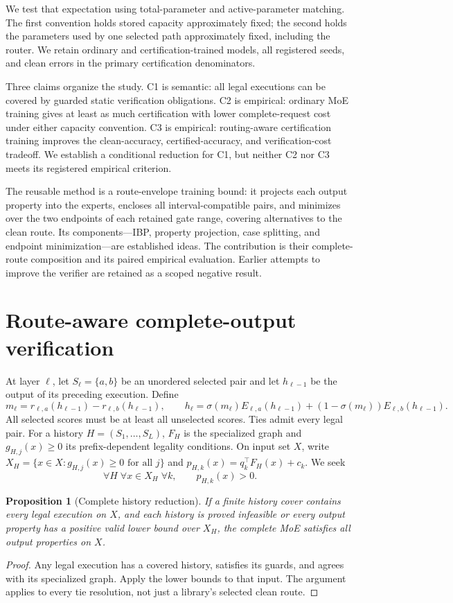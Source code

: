 \documentclass[10pt]{article}
\newtheorem{proposition}{Proposition}
\begin{document}
We test that expectation using total-parameter and active-parameter matching.
The first convention holds stored capacity approximately fixed; the second
holds the parameters used by one selected path approximately fixed, including
the router. We retain ordinary and certification-trained models, all registered
seeds, and clean errors in the primary certification denominators.

Three claims organize the study. C1 is semantic: all legal executions can be
covered by guarded static verification obligations. C2 is empirical: ordinary
MoE training gives at least as much certification with lower complete-request
cost under either capacity convention. C3 is empirical: routing-aware
certification training improves the clean-accuracy, certified-accuracy, and
verification-cost tradeoff. We establish a conditional reduction for C1, but
neither C2 nor C3 meets its registered empirical criterion.

The reusable method is a route-envelope training bound: it projects each
output property into the experts, encloses all interval-compatible pairs, and
minimizes over the two endpoints of each retained gate range, covering
alternatives to the clean route. Its components---IBP, property
projection, case splitting, and endpoint minimization---are established ideas.
The contribution is their complete-route composition and its paired empirical
evaluation. Earlier attempts to improve the verifier are retained as a scoped
negative result.

\section{Route-aware complete-output verification}
At layer $\ell$, let $S_\ell=\{a,b\}$ be an unordered selected pair and let
$h_{\ell-1}$ be the output of its preceding execution. Define
\[
 m_\ell=r_{\ell,a}(h_{\ell-1})-r_{\ell,b}(h_{\ell-1}),\qquad
 h_\ell=\sigma(m_\ell)E_{\ell,a}(h_{\ell-1})+
        (1-\sigma(m_\ell))E_{\ell,b}(h_{\ell-1}).
\]
All selected scores must be at least all unselected scores. Ties admit every
legal pair. For a history $H=(S_1,\ldots,S_L)$, $F_H$ is the specialized graph
and $g_{H,j}(x)\geq0$ its prefix-dependent legality conditions. On input set
$X$, write $X_H=\{x\in X:g_{H,j}(x)\geq0\text{ for all }j\}$ and
$p_{H,k}(x)=q_k^\top F_H(x)+c_k$. We seek
\[
 \forall H\;\forall x\in X_H\;\forall k,\qquad p_{H,k}(x)>0.
\]

\begin{proposition}[Complete history reduction]
If a finite history cover contains every legal execution on $X$, and each
history is proved infeasible or every output property has a positive valid
lower bound over $X_H$, the complete MoE satisfies all output properties on $X$.
\end{proposition}
\begin{proof}
Any legal execution has a covered history, satisfies its guards, and agrees
with its specialized graph. Apply the lower bounds to that input. The argument
applies to every tie resolution, not just a library's selected clean route.
\end{proof}
\end{document}
